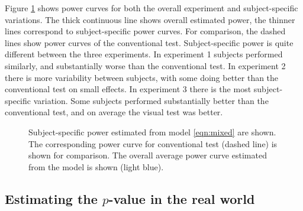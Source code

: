 \documentclass[12pt]{article}
\newcommand{\blue}[1]{{\color{blue} #1}} %
\newcommand{\green}[1]{{\color{green} #1}} %
\begin{document}
Figure  \ref{fig:power_mixed_subject} shows power curves for both the overall experiment and subject-specific variations. The thick continuous line shows overall estimated power, the thinner lines correspond to subject-specific power curves. For comparison, the  dashed lines show power curves of the conventional test. Subject-specific power is quite different between the three experiments. In experiment 1 subjects performed similarly, and substantially worse than the conventional test. In experiment 2 there is more variability between subjects, with some doing better than the conventional test on small effects. In experiment 3 there is the most subject-specific variation. Some subjects performed substantially better than the conventional test, and on average the visual test was better. 

\begin{figure}[hbtp]
   \centering
       \caption{Subject-specific  power estimated from model \ref{eqn:mixed} are shown. The corresponding power curve for conventional test (dashed line) is shown for comparison. The overall average power curve estimated from the model is shown (light blue).}
       \label{fig:power_mixed_subject}
\end{figure}


\subsection{Estimating the $p$-value in the real world} 

\end{document}
